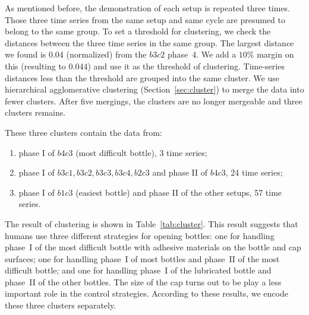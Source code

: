 As mentioned before, the demonstration of each setup is repeated three
times. Those three time series from the same setup and same cycle are presumed to
belong to the same group. To set a threshold for clustering, we
check the distances between the three time series in the same group. The largest distance we found is 0.04
(normalized) from the $b3c2$ phase~4. We add a $10\%$ margin on this
(resulting to 0.044) and use it as the threshold of
clustering. Time-series distances less than the threshold are grouped
into the same cluster. We use hierarchical agglomerative
clustering (Section~\ref{sec:cluster}) to merge the data into
fewer clusters. After five mergings, the clusters are no longer
mergeable and three clusters remains.

These three clusters contain the data from:

\begin{enumerate}
\item phase I of $b4c3$ (most difficult bottle), 3 time series;
\item phase I of $b3c1, b3c2, b3c3, b3c4, b2c3$ and phase II of $b4c3$, 24 time series;
\item phase I of $b1c3$ (easiest bottle) and phase II of the other setups, 57 time series.
\end{enumerate}

The result of clustering is shown in Table~\ref{tab:cluster}. This
result suggests that humans use three different strategies for opening
bottles: one for handling phase~I of the most difficult bottle with
adhesive materials on the bottle and cap surfaces; one for handling
phase~I of most bottles and phase~II of the most difficult bottle; and
one for handling phase~I of the lubricated bottle and phase~II of the
other bottles. The size of the cap turns out to be play a less
important role in the control strategies. According to these results, we
encode these three clusters separately.


